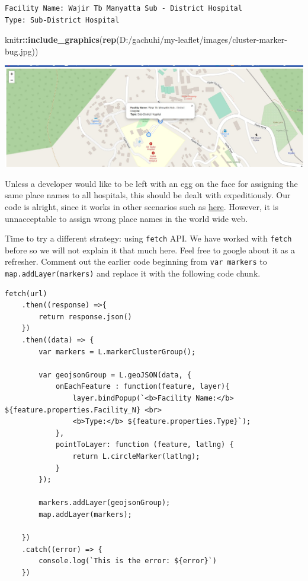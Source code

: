 \documentclass[
]{book}
\newenvironment{Shaded}{\begin{snugshade}}{\end{snugshade}}
\newcommand{\FunctionTok}[1]{\textcolor[rgb]{0.13,0.29,0.53}{\textbf{#1}}}
\newcommand{\NormalTok}[1]{#1}
\newcommand{\SpecialCharTok}[1]{\textcolor[rgb]{0.81,0.36,0.00}{\textbf{#1}}}
\newcommand{\StringTok}[1]{\textcolor[rgb]{0.31,0.60,0.02}{#1}}
\begin{document}
\begin{verbatim}
Facility Name: Wajir Tb Manyatta Sub - District Hospital
Type: Sub-District Hospital
\end{verbatim}

\begin{Shaded}
\begin{Highlighting}[]
\NormalTok{knitr}\SpecialCharTok{::}\FunctionTok{include\_graphics}\NormalTok{(}\FunctionTok{rep}\NormalTok{(}\StringTok{\textquotesingle{}D:/gachuhi/my{-}leaflet/images/cluster{-}marker{-}bug.jpg\textquotesingle{}}\NormalTok{))}
\end{Highlighting}
\end{Shaded}

\includegraphics{../images/cluster-marker-bug.jpg}

Unless a developer would like to be left with an egg on the face for assigning the same place names to all hospitals, this should be dealt with expeditiously. Our code is alright, since it works in other scenarios such as \href{https://gis.stackexchange.com/questions/346104/popup-with-leaflet-markercluster-in-leaflet-map?utm_source=pocket_reader}{here}. However, it is unnacceptable to assign wrong place names in the world wide web.

Time to try a different strategy: using \texttt{fetch} API. We have worked with \texttt{fetch} before so we will not explain it that much here. Feel free to google about it as a refresher. Comment out the earlier code beginning from \texttt{var\ markers} to \texttt{map.addLayer(markers)} and replace it with the following code chunk.

\begin{verbatim}
fetch(url)
    .then((response) =>{
        return response.json()
    })
    .then((data) => {
        var markers = L.markerClusterGroup();

        var geojsonGroup = L.geoJSON(data, {
            onEachFeature : function(feature, layer){
                layer.bindPopup(`<b>Facility Name:</b> ${feature.properties.Facility_N} <br>
                <b>Type:</b> ${feature.properties.Type}`);
            },
            pointToLayer: function (feature, latlng) {
                return L.circleMarker(latlng);
            }
        });

        markers.addLayer(geojsonGroup);
        map.addLayer(markers);

    })
    .catch((error) => {
        console.log(`This is the error: ${error}`)
    })
\end{verbatim}
\end{document}
